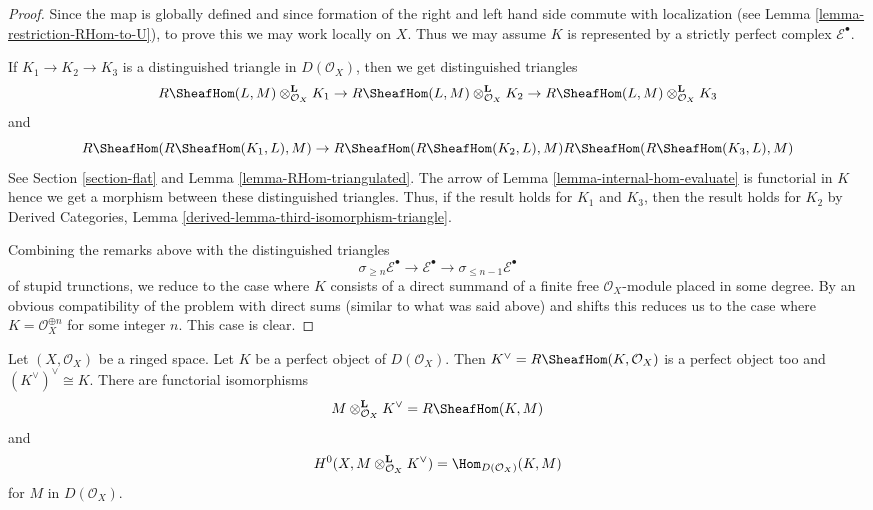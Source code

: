 \begin{proof}
Since the map is globally defined and since formation of the right and
left hand side commute with localization
(see Lemma \ref{lemma-restriction-RHom-to-U}), to prove this we may work
locally on $X$. Thus we may assume $K$ is represented by a strictly
perfect complex $\mathcal{E}^\bullet$.

\medskip\noindent
If $K_1 \to K_2 \to K_3$ is a distinguished triangle in $D(\mathcal{O}_X)$,
then we get distinguished triangles
$$
R\SheafHom(L, M) \otimes_{\mathcal{O}_X}^\mathbf{L} K_1 \to
R\SheafHom(L, M) \otimes_{\mathcal{O}_X}^\mathbf{L} K_2 \to
R\SheafHom(L, M) \otimes_{\mathcal{O}_X}^\mathbf{L} K_3
$$
and
$$
R\SheafHom(R\SheafHom(K_1, L), M) \to
R\SheafHom(R\SheafHom(K_2, L), M)
R\SheafHom(R\SheafHom(K_3, L), M)
$$
See Section \ref{section-flat} and
Lemma \ref{lemma-RHom-triangulated}.
The arrow of Lemma \ref{lemma-internal-hom-evaluate} is functorial in $K$
hence we get a morphism between these distinguished triangles.
Thus, if the result holds for $K_1$ and $K_3$, then the result holds for
$K_2$ by Derived Categories, Lemma
\ref{derived-lemma-third-isomorphism-triangle}.

\medskip\noindent
Combining the remarks above with the distinguished triangles
$$
\sigma_{\geq n}\mathcal{E}^\bullet \to \mathcal{E}^\bullet \to
\sigma_{\leq n - 1}\mathcal{E}^\bullet
$$
of stupid trunctions, we reduce to the case where $K$ consists
of a direct summand of a finite free $\mathcal{O}_X$-module placed
in some degree. By an obvious compatibility of the problem with direct sums
(similar to what was said above) and shifts this reduces us to the case
where $K = \mathcal{O}_X^{\oplus n}$ for some integer $n$.
This case is clear.
\end{proof}

\begin{lemma}
\label{lemma-dual-perfect-complex}
Let $(X, \mathcal{O}_X)$ be a ringed space. Let $K$ be a perfect object of
$D(\mathcal{O}_X)$. Then $K^\vee = R\SheafHom(K, \mathcal{O}_X)$ is a
perfect object too and $(K^\vee)^\vee \cong K$. There are
functorial isomorphisms
$$
M \otimes^\mathbf{L}_{\mathcal{O}_X} K^\vee = R\SheafHom(K, M)
$$
and
$$
H^0(X, M \otimes^\mathbf{L}_{\mathcal{O}_X} K^\vee) =
\Hom_{D(\mathcal{O}_X)}(K, M)
$$
for $M$ in $D(\mathcal{O}_X)$.
\end{lemma}

